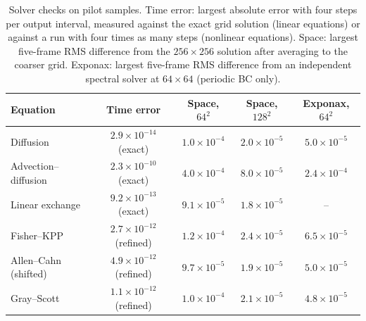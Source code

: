 \begin{table}[h]
\centering
\caption{Solver checks on pilot samples. Time error: largest absolute error with four steps per output interval, measured against the exact grid solution (linear equations) or against a run with four times as many steps (nonlinear equations). Space: largest five-frame RMS difference from the $256\times256$ solution after averaging to the coarser grid. Exponax: largest five-frame RMS difference from an independent spectral solver at $64\times64$ (periodic BC only).}
\label{tab:validation}
\small
\begin{tabular}{lcccc}
\toprule
Equation & Time error & Space, $64^2$ & Space, $128^2$ & Exponax, $64^2$ \\
\midrule
Diffusion & $2.9\times10^{-14}$ (exact) & $1.0\times10^{-4}$ & $2.0\times10^{-5}$ & $5.0\times10^{-5}$ \\
Advection--diffusion & $2.3\times10^{-10}$ (exact) & $4.0\times10^{-4}$ & $8.0\times10^{-5}$ & $2.4\times10^{-4}$ \\
Linear exchange & $9.2\times10^{-13}$ (exact) & $9.1\times10^{-5}$ & $1.8\times10^{-5}$ & -- \\
Fisher--KPP & $2.7\times10^{-12}$ (refined) & $1.2\times10^{-4}$ & $2.4\times10^{-5}$ & $6.5\times10^{-5}$ \\
Allen--Cahn (shifted) & $4.9\times10^{-12}$ (refined) & $9.7\times10^{-5}$ & $1.9\times10^{-5}$ & $5.0\times10^{-5}$ \\
Gray--Scott & $1.1\times10^{-12}$ (refined) & $1.0\times10^{-4}$ & $2.1\times10^{-5}$ & $4.8\times10^{-5}$ \\
\bottomrule
\end{tabular}
\end{table}
